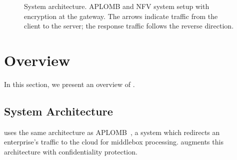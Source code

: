 
\begin{figure}[t!]

\centering
{}
%
\hfill  
{}
     
\caption{System architecture. APLOMB and NFV system setup with \sys encryption  at the gateway. The arrows indicate traffic from the client to the server; the response traffic follows the reverse direction. \label{fig:sys-overview}}
\end{figure}

\section{Overview}\label{sec:overview}

In this section, we present an overview of \sys.


\subsection{System Architecture}

\sys uses the same  architecture as APLOMB~\cite{aplomb}, a system which redirects an enterprise's traffic to the cloud for middlebox processing. \sys augments this architecture with confidentiality protection.


